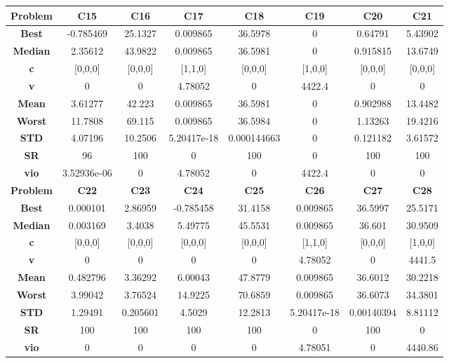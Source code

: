 \documentclass{IEEEtran}
\begin{document}
\begin{center}
\begin{tabular}{|c|c|c|c|c|c|c|c|}
    \hline 
    \hline 
    \textbf{Problem} & \textbf{C15} & \textbf{C16} & \textbf{C17} & \textbf{C18} & \textbf{C19} & \textbf{C20} & \textbf{C21} \\ 
    \hline\hline 
    \textbf{Best} & -0.785469 & 25.1327 & 0.009865 & 36.5978 & 0 & 0.64791 & 5.43902\\ 
    \textbf{Median} & 2.35612 & 43.9822 & 0.009865 & 36.5981 & 0 & 0.915815 & 13.6749\\ 
    \textbf{c} & [0,0,0] & [0,0,0] & [1,1,0] & [0,0,0] & [1,0,0] & [0,0,0] & [0,0,0]\\ 
    \textbf{v} & 0 & 0 & 4.78052 & 0 & 4422.4 & 0 & 0\\ 
    \textbf{Mean} & 3.61277 & 42.223 & 0.009865 & 36.5981 & 0 & 0.902988 & 13.4482\\ 
    \textbf{Worst} & 11.7808 & 69.115 & 0.009865 & 36.5984 & 0 & 1.13263 & 19.4216\\ 
    \textbf{STD} & 4.07196 & 10.2506 & 5.20417e-18 & 0.000144663 & 0 & 0.121182 & 3.61572\\ 
    \textbf{SR} & 96 & 100 & 0 & 100 & 0 & 100 & 100\\ 
    \textbf{vio} & 3.52936e-06 & 0 & 4.78052 & 0 & 4422.4 & 0 & 0\\ 
    \hline 
    \hline 
    \textbf{Problem} & \textbf{C22} & \textbf{C23} & \textbf{C24} & \textbf{C25} & \textbf{C26} & \textbf{C27} & \textbf{C28} \\ 
    \hline\hline 
    \textbf{Best} & 0.000101 & 2.86959 & -0.785458 & 31.4158 & 0.009865 & 36.5997 & 25.5171\\ 
    \textbf{Median} & 0.003169 & 3.4038 & 5.49775 & 45.5531 & 0.009865 & 36.601 & 30.9509\\ 
    \textbf{c} & [0,0,0] & [0,0,0] & [0,0,0] & [0,0,0] & [1,1,0] & [0,0,0] & [1,0,0]\\ 
    \textbf{v} & 0 & 0 & 0 & 0 & 4.78052 & 0 & 4441.5\\ 
    \textbf{Mean} & 0.482796 & 3.36292 & 6.00043 & 47.8779 & 0.009865 & 36.6012 & 30.2218\\ 
    \textbf{Worst} & 3.99042 & 3.76524 & 14.9225 & 70.6859 & 0.009865 & 36.6073 & 34.3801\\ 
    \textbf{STD} & 1.29491 & 0.205601 & 4.5029 & 12.2813 & 5.20417e-18 & 0.00140394 & 8.81112\\ 
    \textbf{SR} & 100 & 100 & 100 & 100 & 0 & 100 & 0\\ 
    \textbf{vio} & 0 & 0 & 0 & 0 & 4.78051 & 0 & 4440.86\\ 
    \hline 
  \end{tabular}
\end{center}
\end{document}
